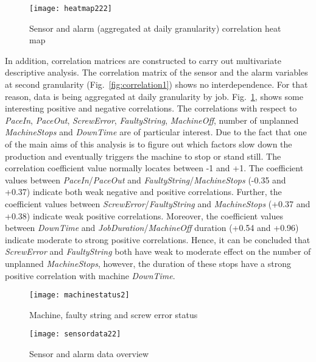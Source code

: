 \documentclass[runningheads]{llncs}
\begin{document}
\begin{figure}
\centering
    \texttt{[image: heatmap222]}
  \caption{Sensor and alarm (aggregated at daily granularity) correlation heat map \cite{nadeem}}
  \label{fig:correlation2}
\end{figure}

In addition, correlation matrices are constructed to carry out multivariate descriptive analysis. The correlation matrix of the sensor and the alarm variables at second granularity (Fig.~\ref{fig:correlation1}) shows no interdependence. For that reason, data is being aggregated at daily granularity by job. Fig.~\ref{fig:correlation2}, shows some interesting positive and negative correlations. The correlations with respect to \emph{PaceIn}, \emph{PaceOut}, \emph{ScrewError}, \emph{FaultyString}, \emph{MachineOff}, number of unplanned \emph{MachineStops} and \emph{DownTime} are of particular interest. Due to the fact that one of the main aims of this analysis is to figure out which factors slow down the production and eventually triggers the machine to stop or stand still. The correlation coefficient value normally locates between -1 and +1. The coefficient values between \emph{PaceIn}/\emph{PaceOut} and \emph{FaultyString}/\emph{MachineStops} (-0.35 and +0.37) indicate both weak negative and positive correlations. Further, the coefficient values between \emph{ScrewError}/\emph{FaultyString} and \emph{MachineStops} (+0.37 and +0.38) indicate weak positive correlations.  Moreover, the coefficient values  between \emph{DownTime} and \emph{JobDuration}/\emph{MachineOff} duration (+0.54 and +0.96) indicate moderate to strong positive correlations. Hence, it can be concluded that \emph{ScrewError} and \emph{FaultyString} both have weak to moderate effect on the number of unplanned \emph{MachineStops}, however, the duration of these stops have a strong positive correlation with machine \emph{DownTime}. 

\begin{figure}
\centering
\texttt{[image: machinestatus2]} 
\caption{Machine, faulty string and screw error status}
\label{fig:status}
\end{figure}


 \begin{figure}
\centering
\texttt{[image: sensordata22]} 
\caption{Sensor and alarm data overview \cite{nadeem}}
\label{fig:sensordataoverview}
\end{figure}
\end{document}
